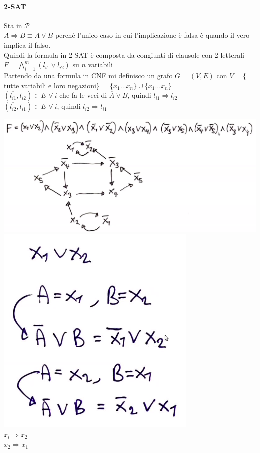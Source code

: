 \documentclass[10pt]{book}
\begin{document}
\paragraph{2-SAT} Sta in $\mathscr{P}$\\
$A \Rightarrow B \equiv \overline{A} \vee B$ perché l'unico caso in cui l'implicazione è falsa è quando il vero implica il falso.\\Quindi la formula in 2-SAT è composta da congiunti di clausole con 2 letterali $F = \bigwedge_{i=1}^m (l_{i1} \vee l_{i2})$ su $n$ variabili\\
Partendo da una formula in CNF mi definisco un grafo $G=(V,E)$ con $V = \{$tutte variabili e loro negazioni$\}$ = $\{x_1\ldots x_n\}\cup\{\overline{x_1}\ldots\overline{x_n}\}$\\
$(\overline{l_{i1}}, l_{i2}) \in E$ $\forall\:i$ che fa le veci di $\overline{A}\vee B$, quindi $l_{i1} \Rightarrow l_{i2}$\\
$(\overline{l_{i2}}, l_{i1}) \in E$ $\forall\:i$, quindi $l_{i2} \Rightarrow l_{i1}$
\begin{center}
	\includegraphics[scale=0.5]{2.png}\\
	\includegraphics[scale=0.5]{3.png}\\
	$x_i \Rightarrow x_2$\\
	$x_2 \Rightarrow x_1$
\end{center}
\end{document}
